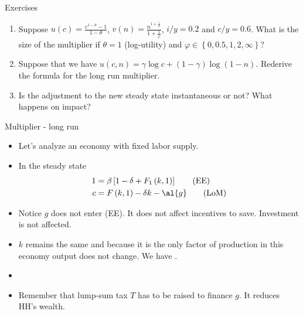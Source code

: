 \documentclass[11pt,xcolor={dvipsnames},aspectratio=159,hyperref={pdftex,pdfpagemode=UseNone,hidelinks,pdfdisplaydoctitle=true},usepdftitle=false]{beamer}
\begin{document}
        \begin{frame}{Exercises}
        
        \begin{enumerate}
        \item Suppose $u\left(c\right)=\frac{c^{1-\theta}-1}{1-\theta}$,
        $v\left(n\right)=\frac{n^{1+\frac{1}{\varphi}}}{1+\frac{1}{\varphi}}$,
        $i/y=0.2$ and $c/y=0.6$. What is the size of the multiplier if $\theta=1$
        (log-utility) and $\varphi\in\left\{ 0,0.5,1,2,\infty\right\} $?
        \item Suppose that we have $u\left(c,n\right)=\gamma\log c+\left(1-\gamma\right)\log\left(1-n\right)$.
        Rederive the formula for the long run multiplier. 
        \item Is the adjustment to the new steady state instantaneous
        or not? What happens on impact?
        \end{enumerate}
        \end{frame}
        \begin{frame}{Multiplier - long run}
        \begin{itemize}
        \item Let's analyze an economy with fixed labor supply. 
        \item In the steady state
        \begin{align}
        1 & =\beta\left[1-\delta+F_{1}\left(k,1\right)\right]\tag{EE}\label{EE-1-2}\\
        c & =F\left(k,1\right)-\delta k-\al{g}\tag{LoM}\label{LoM-1-2}
        \end{align}
        \item Notice $g$ does not enter (EE). It does not affect incentives to
        save. Investment is not affected. 
        \item $k$ remains the same and because it is the only factor of production
        in this economy output does not change. We have .
        \item {}
        \item Remember that lump-sum tax $T$ has to be raised to finance $g$.
        It reduces HH's wealth. 
        \end{itemize}
        \end{frame}
\end{document}

